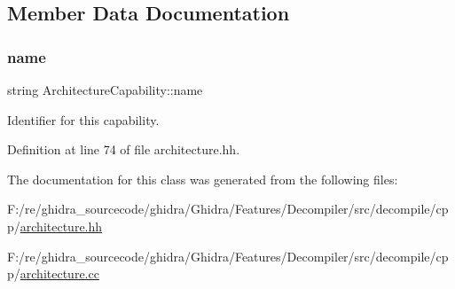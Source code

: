 \subsection{Member Data Documentation}
\mbox{\label{class_architecture_capability_a685df0ea6f90347afa6eb27d0b3fd3cc}} 
\subsubsection{\texorpdfstring{name}{name}}
{\footnotesize\ttfamily string Architecture\+Capability\+::name\hspace{0.3cm}{\ttfamily [protected]}}



Identifier for this capability. 



Definition at line 74 of file architecture.\+hh.



The documentation for this class was generated from the following files\+:\begin{DoxyCompactItemize}
\item 
F\+:/re/ghidra\+\_\+sourcecode/ghidra/\+Ghidra/\+Features/\+Decompiler/src/decompile/cpp/\mbox{\hyperlink{architecture_8hh}{architecture.\+hh}}\item 
F\+:/re/ghidra\+\_\+sourcecode/ghidra/\+Ghidra/\+Features/\+Decompiler/src/decompile/cpp/\mbox{\hyperlink{architecture_8cc}{architecture.\+cc}}\end{DoxyCompactItemize}
